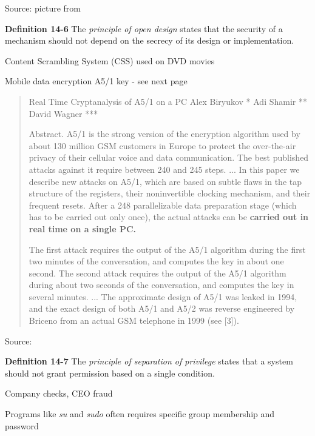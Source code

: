\documentclass[Screen16to9,17pt]{foils}
\begin{document}


Source: picture from 
\begin{list1}
\item {\bf Definition 14-6} The \emph{principle of open design} states that the security of a mechanism should not depend on the secrecy of its design or implementation.
\item Content Scrambling System (CSS) used on DVD movies
\item Mobile data encryption  A5/1 key - see next page
\end{list1}


\begin{quote}
  Real Time Cryptanalysis of A5/1 on a PC
Alex Biryukov * Adi Shamir ** David Wagner ***

  Abstract. A5/1 is the strong version of the encryption algorithm used by about 130 million GSM customers in Europe to protect the over-the-air privacy of their cellular voice and data communication. The best published attacks against it require between 240 and 245 steps. ...
  In this paper we describe new attacks on A5/1, which are based on subtle flaws in the tap structure of the registers, their noninvertible clocking mechanism, and their frequent resets. After a 248 parallelizable data preparation stage (which has to be carried out only once), the actual attacks can be {\bf carried out in real time on a single PC.}

  The first attack requires the output of the A5/1 algorithm during the first two minutes of the conversation, and computes the key in about one second. The second attack requires the output of the A5/1 algorithm during about two seconds of the conversation, and computes the key in several minutes.
  ...
  The approximate design of A5/1 was leaked in 1994, and the exact design of both A5/1 and A5/2 was reverse engineered by Briceno from an actual GSM telephone in 1999 (see [3]).
\end{quote}
Source: 




\begin{list1}
\item {\bf Definition 14-7} The \emph{principle of separation of privilege} states that a system should not grant permission based on a single condition.
\item Company checks, CEO fraud
\item Programs like \emph{su} and \emph{sudo} often requires specific group membership and password
\end{list1}
\end{document}
